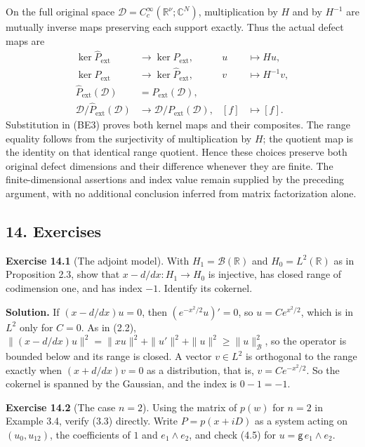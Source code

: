 \documentclass[
  11pt,
]{article}
\begin{document}
On the full original space
\(\mathcal D=C_c^\infty(\mathbb R^\nu;\mathbb C^N)\), multiplication by
\(H\) and by \(H^{-1}\) are mutually inverse maps preserving each
support exactly. Thus the actual defect maps are \[
 \begin{aligned}
 \ker\widehat P_{\mathrm{ext}}&\longrightarrow
       \ker P_{\mathrm{ext}},&u&\longmapsto Hu,\\
 \ker P_{\mathrm{ext}}&\longrightarrow
       \ker\widehat P_{\mathrm{ext}},&v&\longmapsto H^{-1}v,\\
 \widehat P_{\mathrm{ext}}(\mathcal D)
      &=P_{\mathrm{ext}}(\mathcal D),&&\\
 \mathcal D/\widehat P_{\mathrm{ext}}(\mathcal D)
      &\longrightarrow\mathcal D/P_{\mathrm{ext}}(\mathcal D),
      &[f]&\longmapsto[f].
 \end{aligned}
 \tag{BE4}
\] Substitution in (BE3) proves both kernel maps and their composites.
The range equality follows from the surjectivity of multiplication by
\(H\); the quotient map is the identity on that identical range
quotient. Hence these choices preserve both original defect dimensions
and their difference whenever they are finite. The finite-dimensional
assertions and index value remain supplied by the preceding argument,
with no additional conclusion inferred from matrix factorization alone.

\subsection{14. Exercises}\label{exercises}

\textbf{Exercise 14.1} (The adjoint model). With
\(H_1=\mathcal B(\mathbb R)\) and \(H_0=L^2(\mathbb R)\) as in
Proposition 2.3, show that \(x-d/dx:H_1\to H_0\) is injective, has
closed range of codimension one, and has index \(-1\). Identify its
cokernel.

\textbf{Solution.} If \((x-d/dx)u=0\), then \((e^{-x^2/2}u)'=0\), so
\(u=Ce^{x^2/2}\), which is in \(L^2\) only for \(C=0\). As in (2.2),
\(\|(x-d/dx)u\|^2=\|xu\|^2+\|u'\|^2+\|u\|^2\ge\|u\|_{\mathcal B}^2\), so
the operator is bounded below and its range is closed. A vector
\(v\in L^2\) is orthogonal to the range exactly when \((x+d/dx)v=0\) as
a distribution, that is, \(v=Ce^{-x^2/2}\). So the cokernel is spanned
by the Gaussian, and the index is \(0-1=-1\).

\textbf{Exercise 14.2} (The case \(n=2\)). Using the matrix of \(p(w)\)
for \(n=2\) in Example 3.4, verify (3.3) directly. Write \(P=p(x+iD)\)
as a system acting on \((u_0,u_{12})\), the coefficients of \(1\) and
\(e_1\wedge e_2\), and check (4.5) for \(u=\mathsf g\,e_1\wedge e_2\).
\end{document}
